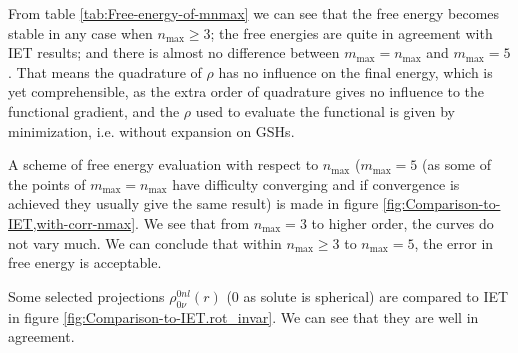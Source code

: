 From table \ref{tab:Free-energy-of-mnmax} we can see that the free
energy becomes stable in any case when $n_{\max}\geq3$; the free
energies are quite in agreement with \acs{IET} results; and there
is almost no difference between $m_{\max}=n_{\max}$ and $m_{\max}=5$.
That means the quadrature of $\rho$ has no influence on the final
energy, which is yet comprehensible, as the extra order of quadrature
gives no influence to the functional gradient, and the $\rho$ used
to evaluate the functional is given by minimization, i.e. without
expansion on \acs{GSH}s.

A scheme of free energy evaluation with respect to $n_{\max}$ ($m_{\max}=5$
(as some of the points of $m_{\max}=n_{\max}$ have difficulty converging
and if convergence is achieved they usually give the same result)
is made in figure \ref{fig:Comparison-to-IET,with-corr-nmax}. We
see that from $n_{\max}=3$ to higher order, the curves do not vary
much. We can conclude that within $n_{\max}\geq3$ to $n_{\max}=5$,
the error in free energy is acceptable.

Some selected projections $\rho_{0\nu}^{0nl}(r)$ (0 as solute is
spherical) are compared to \acs{IET} in figure \ref{fig:Comparison-to-IET.rot_invar}.
We can see that they are well in agreement.


